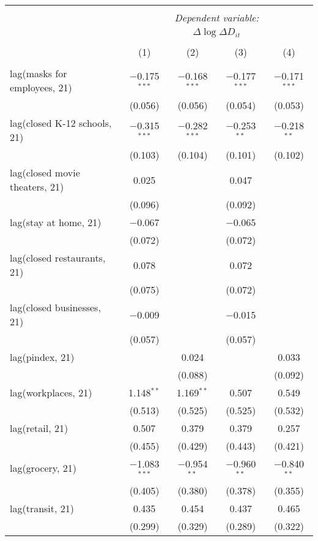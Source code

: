 \begin{tabular}{@{\extracolsep{1pt}}lcccc} 
\\[-1.8ex]\hline 
\hline \\[-1.8ex] 
 & \multicolumn{4}{c}{\textit{Dependent variable:}} \\ 
\cline{2-5} 
 & \multicolumn{4}{c}{$\Delta \log \Delta D_{it}$} \\ 
\\[-1.8ex] & (1) & (2) & (3) & (4)\\ 
\hline \\[-1.8ex] 
 lag(masks for employees, 21) & $-$0.175$^{***}$ & $-$0.168$^{***}$ & $-$0.177$^{***}$ & $-$0.171$^{***}$ \\ 
  & (0.056) & (0.056) & (0.054) & (0.053) \\ 
  lag(closed K-12 schools, 21) & $-$0.315$^{***}$ & $-$0.282$^{***}$ & $-$0.253$^{**}$ & $-$0.218$^{**}$ \\ 
  & (0.103) & (0.104) & (0.101) & (0.102) \\ 
  lag(closed movie theaters, 21) & 0.025 &  & 0.047 &  \\ 
  & (0.096) &  & (0.092) &  \\ 
  lag(stay at home, 21) & $-$0.067 &  & $-$0.065 &  \\ 
  & (0.072) &  & (0.072) &  \\ 
  lag(closed restaurants, 21) & 0.078 &  & 0.072 &  \\ 
  & (0.075) &  & (0.072) &  \\ 
  lag(closed businesses, 21) & $-$0.009 &  & $-$0.015 &  \\ 
  & (0.057) &  & (0.057) &  \\ 
  lag(pindex, 21) &  & 0.024 &  & 0.033 \\ 
  &  & (0.088) &  & (0.092) \\ 
  lag(workplaces, 21) & 1.148$^{**}$ & 1.169$^{**}$ & 0.507 & 0.549 \\ 
  & (0.513) & (0.525) & (0.525) & (0.532) \\ 
  lag(retail, 21) & 0.507 & 0.379 & 0.379 & 0.257 \\ 
  & (0.455) & (0.429) & (0.443) & (0.421) \\ 
  lag(grocery, 21) & $-$1.083$^{***}$ & $-$0.954$^{**}$ & $-$0.960$^{**}$ & $-$0.840$^{**}$ \\ 
  & (0.405) & (0.380) & (0.378) & (0.355) \\ 
  lag(transit, 21) & 0.435 & 0.454 & 0.437 & 0.465 \\ 
  & (0.299) & (0.329) & (0.289) & (0.322) \\ 

\end{tabular}
